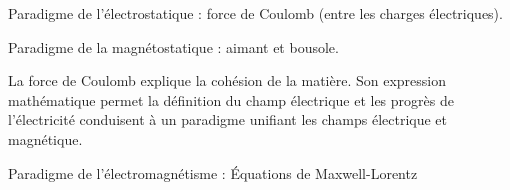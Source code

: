 \begin{center}
Paradigme de l'électrostatique : force de Coulomb (entre les charges électriques).

Paradigme de la magnétostatique : aimant et bousole.
\end{center}

La force de Coulomb explique la cohésion de la matière. Son expression mathématique permet la définition du champ électrique et les progrès de l'électricité conduisent à un paradigme unifiant les champs électrique et magnétique.

\begin{center}
Paradigme de l'électromagnétisme : Équations de Maxwell-Lorentz
\end{center}

\subsection{}\subsection{}
\begin{center}
\end{center}

